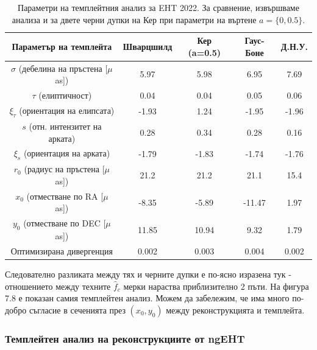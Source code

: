 \begin{table}[h!]
	\centering
	\begin{tabular}{c|c|c|c|c}
		\hline
		{Параметър на темплейта} & {Шварцшилд}&{Кер (a=0.5)}&{Гаус-Боне}&{Д.Н.У.}
		\\\hline\hline
		$\sigma$ {(\small дебелина на пръстена [$\mu$as])}& 5.97& 5.98& 6.95& 7.69
		\\
		$\tau$ {(\small елиптичност)} & 0.04& 0.04& 0.05& 0.06
		\\
		$\xi_\tau$ {(\small ориентация на елипсата)}& -1.93& 1.24& -1.95& -1.96
		\\
		$s$ {(\small отн. интензитет на арката)} & 0.28& 0.34& 0.28& 0.16
		\\
		$\xi_s$ {(\small ориентация на арката)}  & -1.79& -1.83& -1.74& -1.76
		\\\hline
		$r_0$ {(\small радиус на пръстена [$\mu$as])} & 21.2& 21.2& 21.1&15.4
		\\
		$x_0$ {(\small отместване по RA [$\mu$as])}  & -8.35& -5.89& -11.47& 1.97
		\\
		$y_0$ {(\small отместване по DEC [$\mu$as])} & 11.85& 10.94& 9.32& 1.79
		\\\hline\hline
		{Оптимизирана дивергенция} & 0.002& 0.003& 0.004& 0.002
		\\ \hline
	\end{tabular}
	\caption[Параметри на темплейтния анализ за EHT 2022.]{\small Параметри на темплейтния анализ за EHT 2022. За сравнение, извършваме анализа и за двете черни дупки на Кер при параметри на въртене $a =\{0,0.5\}$.}
	\label{table:VIDA_2022}
\end{table}

\newpage

Следователно разликата между тях и черните дупки е по-ясно изразена тук - отношението между техните $\hat{f}_c$ мерки нараства приблизително 2 пъти. 
На фигура 7.8 е показан самия темплейтен анализ. Можем да забележим, че има много по-добро съгласие в сеченията през $(x_0,y_0)$ между реконструкцията и темплейта.


\subsubsection{Темплейтен анализ на реконструкциите от ngEHT}

